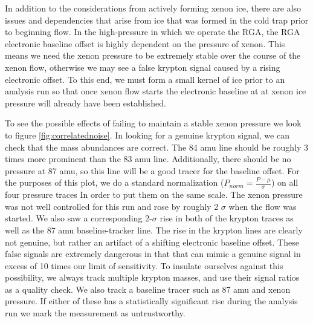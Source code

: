 \documentclass[12pt]{article}
\begin{document}
In addition to the considerations from actively forming xenon ice, there are also issues and dependencies that arise from ice that was formed in the cold trap prior to beginning flow. In the high-pressure in which we operate the RGA, the RGA electronic baseline offset is highly dependent on the pressure of xenon. This means we need the xenon pressure to be extremely stable over the course of the xenon flow, otherwise we may see a false krypton signal caused by a rising electronic offset. To this end, we must form a small kernel of ice prior to an analysis run so that once xenon flow starts the electronic baseline at at xenon ice pressure will already have been established. 

To see the possible effects of failing to maintain a stable xenon pressure we look to figure \ref{fig:correlatednoise}. In looking for a genuine krypton signal, we can check that the mass abundances are correct. The 84 amu line should be roughly 3 times more prominent than the 83 amu line. Additionally, there should be no pressure at 87 amu, so this line will be a good tracer for the baseline offset. For the purposes of this plot, we do a standard normalization ($P_{norm}=\frac{P-\mu}{\sigma}$) on all four pressure traces In order to put them on the same scale. The xenon pressure was not well controlled for this run and rose by roughly 2 $\sigma$ when the flow was started. We also saw a corresponding 2-$\sigma$ rise in both of the krypton traces as well as the 87 amu baseline-tracker line. The rise in the krypton lines are clearly not genuine, but rather an artifact of a shifting electronic baseline offset. These false signals are extremely dangerous in that that can mimic a genuine signal in excess of 10 times our limit of sensitivity. To insulate ourselves against this possibility, we always track multiple krypton masses, and use their signal ratios as a quality check. We also track a baseline tracer such as 87 amu and xenon pressure. If either of these has a statistically significant rise during the analysis run we mark the measurement as untrustworthy.
\end{document}
